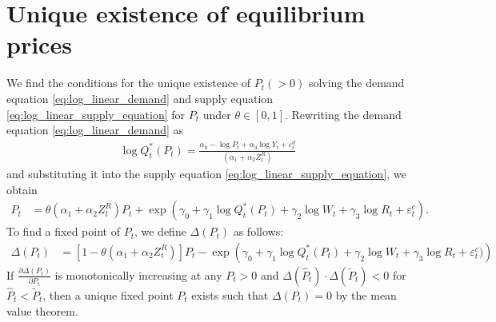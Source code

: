 \documentclass[11pt, a4paper]{article}
\begin{document}
\section{Unique existence of equilibrium prices}
We find the conditions for the unique existence of $P_{t}(>0)$ solving the demand equation \eqref{eq:log_linear_demand} and supply equation \eqref{eq:log_linear_supply_equation} for $P_{t}$ under $\theta\in[0,1]$.
Rewriting the demand equation \eqref{eq:log_linear_demand} as 
\begin{align*}
    \log Q_t^*(P_{t})= \frac{\alpha_0 - \log P_{t} + \alpha_3 \log Y_t + \varepsilon^{d}_{t}}{(\alpha_1 + \alpha_2 Z^{R}_{t})}   
\end{align*}
and substituting it into the supply equation \eqref{eq:log_linear_supply_equation}, we obtain
\begin{align}
    P_t &=\theta (\alpha_1 + \alpha_2 Z^{R}_{t}) P_t + \exp\left(\gamma_0 + \gamma_1 \log Q^*_t(P_{t}) +  \gamma_2 \log W_{t} + \gamma_3 \log R_t + \varepsilon^{c}_{t}\right). \nonumber
\end{align}
To find a fixed point of $P_{t}$, we define $\Delta(P_t)$ as follows:
\begin{align*}
    \Delta(P_t)
    &= [1 - \theta (\alpha_1 + \alpha_2 Z^{R}_{t})]P_t - \exp\left( \gamma_0 + \gamma_1 \log Q_t^*(P_{t}) + \gamma_2 \log W_{t} + \gamma_3 \log R_t + \varepsilon^{c}_{t})\right)
\end{align*}
If $\frac{\partial\Delta(P_t)}{\partial P_t}$ is monotonically increasing at any $P_{t}>0$ and $\Delta(\hat{P}_t)\cdot \Delta(\tilde{P}_t)<0$ for $\hat{P}_t < \tilde{P}_t$, then a unique fixed point $P_t$ exists such that $\Delta(P_t)=0$ by the mean value theorem.
\end{document}
